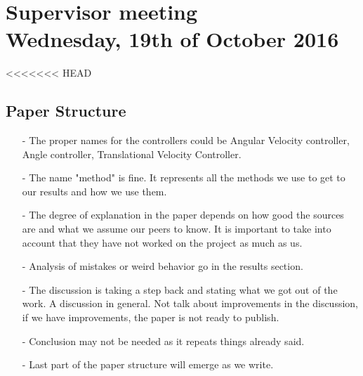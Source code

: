 
\renewcommand{\vec}[1]{\boldsymbol{\mathbf{#1}}}

\renewcommand\chaptername{KAPITEL}
\renewcommand\contentsname{Indhold}
\renewcommand\figurename{Figur}
\renewcommand\tablename{Tabel}

\section*{Supervisor meeting\\ \small Wednesday, 19th of October 2016}

<<<<<<< HEAD
\subsection{Paper Structure}
\begin{itemize}
  \item[-] The proper names for the controllers could be Angular Velocity controller, Angle controller, Translational Velocity Controller.
  \item[-] The name "method" is fine. It represents all the methods we use to get to our results and how we use them.
  \item[-] The degree of explanation in the paper depends on how good the sources are and what we assume our peers to know. It is important to take into account that they have not worked on the project as much as us.
  \item[-] Analysis of mistakes or weird behavior go in the results section.
  \item[-] The discussion is taking a step back and stating what we got out of the work. A discussion in general. Not talk about improvements in the discussion, if we have improvements, the paper is not ready to publish.
  \item[-] Conclusion may not be needed as it repeats things already said.
  \item[-] Last part of the paper structure will emerge as we write.
\end{itemize}

